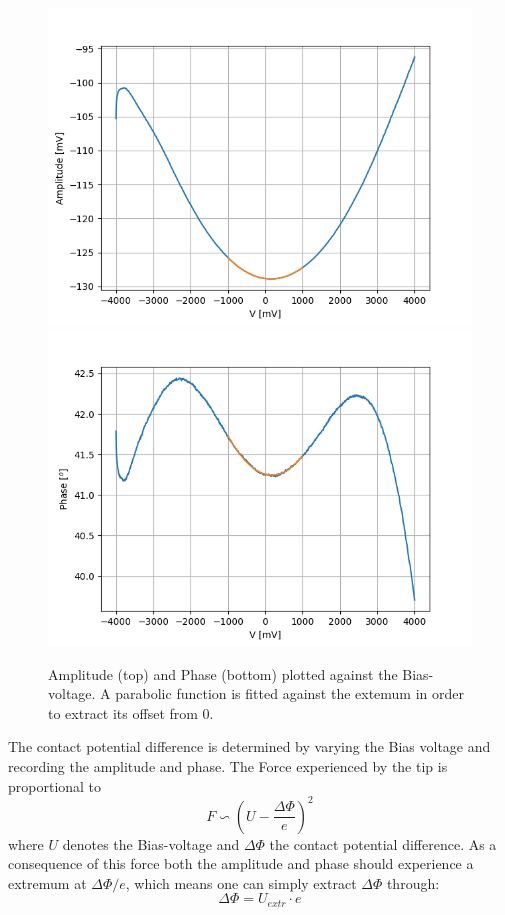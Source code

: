 \documentclass[%
 reprint,
amsmath,amssymb,
pra,
]{revtex4-1}
\begin{document}
\begin{figure}[h]
\centering
\includegraphics[scale=0.5]{Bilder/Magnetic/amplitude.PNG}
\includegraphics[scale=0.5]{Bilder/Magnetic/phase.PNG}
\caption{Amplitude (top) and Phase (bottom) plotted against the Bias-voltage. A parabolic function is fitted against the extemum in order to extract its offset from 0.}
\label{fig:bias}
\end{figure}

The contact potential difference is determined by varying the Bias voltage and recording the amplitude and phase. The Force experienced by the tip is proportional to
\begin{equation}
F \backsim \left(U-\dfrac{\Delta\Phi}{e}\right)^2
\end{equation}
where $U$ denotes the Bias-voltage and $\Delta\Phi$ the contact potential difference. As a consequence of this force both the amplitude and phase should experience a extremum at $\Delta\Phi / e$, which means one can simply extract $\Delta\Phi$ through:
\begin{equation}
\Delta\Phi = U_{extr} \cdot e
\label{eq:phi}
\end{equation}
\end{document}
